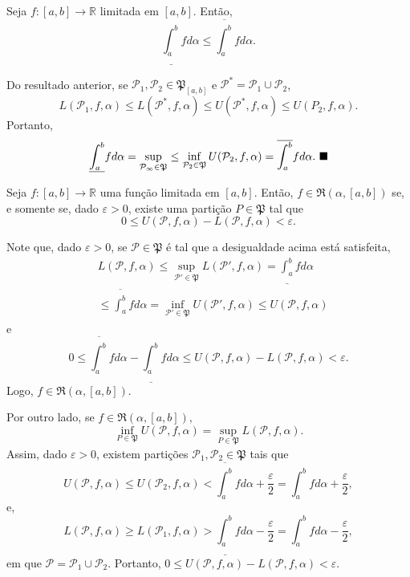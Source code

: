 \documentclass[analysis_notes.tex]{subfiles}
\begin{document}
\begin{theorem*}
	Seja \(f:[a, b]\rightarrow \mathbb{R}\) limitada em \([a, b]\). Então,
	\[
		\underline{\int_{a}^{b}} f d\alpha\leq \overline{\int_{a}^{b}}f d\alpha .
	\]
\end{theorem*}
\begin{proof*}
	Do resultado anterior, se \(\mathcal{P}_{1}, \mathcal{P}_{2}\in \mathfrak{P}_{[a, b]}\) e \(\mathcal{P}^{*} = \mathcal{P}_{1}\cup \mathcal{P}_{2}\),
	\[
		L(\mathcal{P}_{1}, f, \alpha )\leq L(\mathcal{P}^{*}, f, \alpha )\leq U(\mathcal{P}^{*}, f, \alpha )\leq U(P_{2}, f, \alpha ).
	\]
	Portanto,
	\[
		\underline{\int_{a}^{b}}f d\alpha =\sup_{\mathcal{P_{1}}\in \mathfrak{P}}\leq \inf_{\mathcal{P}_{2}\in \mathfrak{P}} U(\mathcal{P}_{2}, f, \alpha ) = \overline{\int_{a}^{b}}f d\alpha .\text{ $\blacksquare$}
	\]
\end{proof*}
\begin{crl*}
	Seja \(f:[a, b]\rightarrow \mathbb{R}\) uma fun\c cão limitada em \([a, b].\) Então, \(f\in \mathfrak{R}(\alpha , [a, b])\) se, e somente se,
	dado \(\varepsilon >0\), existe uma parti\c cão \(P\in \mathfrak{P}\) tal que
	\[
		0\leq U(\mathcal{P}, f, \alpha ) - L(\mathcal{P}, f, \alpha ) <\varepsilon .
	\]
\end{crl*}
\begin{proof*}
	Note que, dado \(\varepsilon  >0\), se \(\mathcal{P}\in \mathfrak{P}\) é tal que a desigualdade acima está satisfeita,
	\begin{align*}
		 & L(\mathcal{P}, f, \alpha )\leq \sup_{\mathcal{P}'\in \mathfrak{P}}L(\mathcal{P}', f, \alpha ) = \underline{\int_{a}^{b}}f d\alpha     \\
		 & \leq \overline{\int_{a}^{b}}f d\alpha = \inf_{\mathcal{P}'\in \mathfrak{P}}U(\mathcal{P}', f, \alpha )\leq U(\mathcal{P}, f, \alpha )
	\end{align*}
	e
	\[
		0\leq \overline{\int_{a}^{b}}f d\alpha  - \underline{\int_{a}^{b}}f d\alpha\leq U(\mathcal{P}, f, \alpha ) - L(\mathcal{P}, f,\alpha ) <\varepsilon .
	\]
	Logo, \(f\in \mathfrak{R}(\alpha, [a,b])\).

	Por outro lado, se \(f\in \mathfrak{R}(\alpha , [a,b]),\)
	\[
		\inf_{P\in \mathfrak{P}}U(\mathcal{P}, f, \alpha ) = \sup_{P\in \mathfrak{P}}L(\mathcal{P}, f, \alpha ).
	\]
	Assim, dado \(\varepsilon >0\), existem parti\c cões \(\mathcal{P}_{1}, \mathcal{P}_{2}\in \mathfrak{P}\) tais que
	\[
		U(\mathcal{P}, f, \alpha )\leq U(\mathcal{P}_{2}, f, \alpha ) < \overline{\int_{a}^{b}}f d\alpha +\frac{\varepsilon }{2} = \int_{a}^{b} f d\alpha  + \frac{\varepsilon }{2},
	\]
	e,
	\[
		L(\mathcal{P}, f, \alpha )\geq L(\mathcal{P}_{1}, f, \alpha ) > \underline{\int_{a}^{b}} f d\alpha - \frac{\varepsilon }{2} = \int_{a}^{b}f d\alpha - \frac{\varepsilon }{2},
	\]
	em que \(\mathcal{P} = \mathcal{P}_{1}\cup \mathcal{P}_{2}.\) Portanto, \(0\leq U(\mathcal{P}, f, \alpha ) - L(\mathcal{P}, f, \alpha ) < \varepsilon .\) \qedsymbol
\end{proof*}
\end{document}
